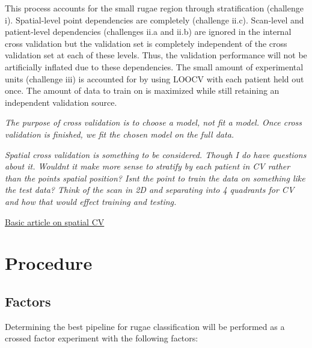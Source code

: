 \documentclass[11pt]{article}
\theoremstyle{definition}
\begin{document}
This process accounts for the small rugae region through stratification (challenge i). Spatial-level point dependencies are completely (challenge ii.c). Scan-level and patient-level dependencies (challenges ii.a and ii.b) are ignored in the internal cross validation but the validation set is completely independent of the cross validation set at each of these levels. Thus, the validation performance will not be artificially inflated due to these dependencies. The small amount of experimental units (challenge iii) is accounted for by using LOOCV with each patient held out once. The amount of data to train on is maximized while still retaining an independent validation source.

\textit{The purpose of cross validation is to choose a model, not fit a model. Once cross validation is finished, we fit the chosen model on the full data.}

\textit{Spatial cross validation is something to be considered. Though I do have questions about it. Wouldnt it make more sense to stratify by each patient in CV rather than the points spatial position? Isnt the point to train the data on something like the test data? Think of the scan in 2D and separating into 4 quadrants for CV and how that would effect training and testing.}

\href{https://towardsdatascience.com/spatial-cross-validation-using-scikit-learn-74cb8ffe0ab9/}{Basic article on spatial CV}

\newpage

\section{Procedure}

\subsection{Factors}

Determining the best pipeline for rugae classification will be performed as a crossed factor experiment with the following factors:
\end{document}
